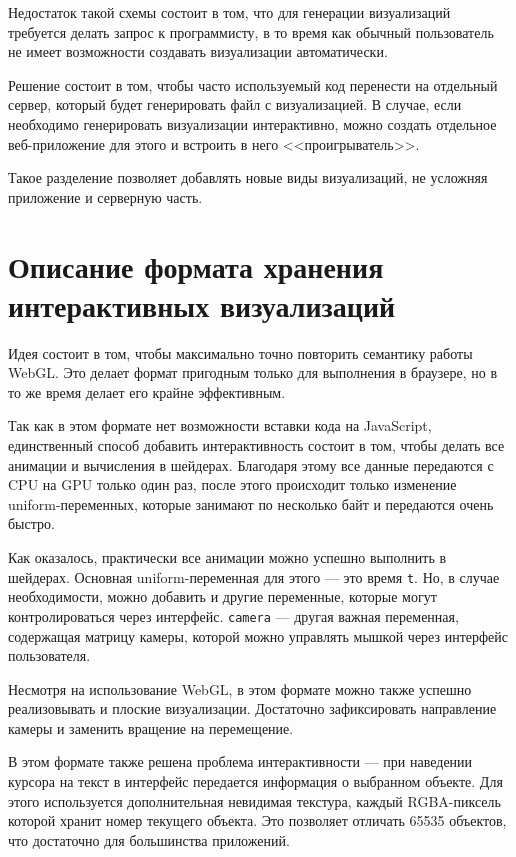Недостаток такой схемы состоит в том, что для генерации визуализаций требуется делать запрос к программисту, в то время как обычный пользователь не имеет возможности создавать визуализации автоматически.

Решение состоит в том, чтобы часто используемый код перенести на отдельный сервер, который будет генерировать файл с визуализацией. В случае, если необходимо генерировать визуализации интерактивно, можно создать отдельное веб-приложение для этого и встроить в него <<проигрыватель>>.

Такое разделение позволяет добавлять новые виды визуализаций, не усложняя приложение и серверную часть.

\section{Описание формата хранения интерактивных визуализаций}

\label{sec:format}

Идея состоит в том, чтобы максимально точно повторить семантику работы WebGL. Это делает формат пригодным только для выполнения в браузере, но в то же время делает его крайне эффективным.

Так как в этом формате нет возможности вставки кода на JavaScript, единственный способ добавить интерактивность состоит в том, чтобы делать все анимации и вычисления в шейдерах. Благодаря этому все данные передаются с CPU на GPU только один раз, после этого происходит только изменение uniform-переменных, которые занимают по несколько байт и передаются очень быстро.

Как оказалось, практически все анимации можно успешно выполнить в шейдерах. Основная uniform-переменная для этого --- это время \texttt{t}. Но, в случае необходимости, можно добавить и другие переменные, которые могут контролироваться через интерфейс. \texttt{camera} --- другая важная переменная, содержащая матрицу камеры, которой можно управлять мышкой через интерфейс пользователя.

Несмотря на использование WebGL, в этом формате можно также успешно реализовывать и плоские визуализации. Достаточно зафиксировать направление камеры и заменить вращение на перемещение.

В этом формате также решена проблема интерактивности --- при наведении курсора на текст в интерфейс передается информация о выбранном объекте. Для этого используется дополнительная невидимая текстура, каждый RGBA-пиксель которой хранит номер текущего объекта. Это позволяет отличать 65535 объектов, что достаточно для большинства приложений.


